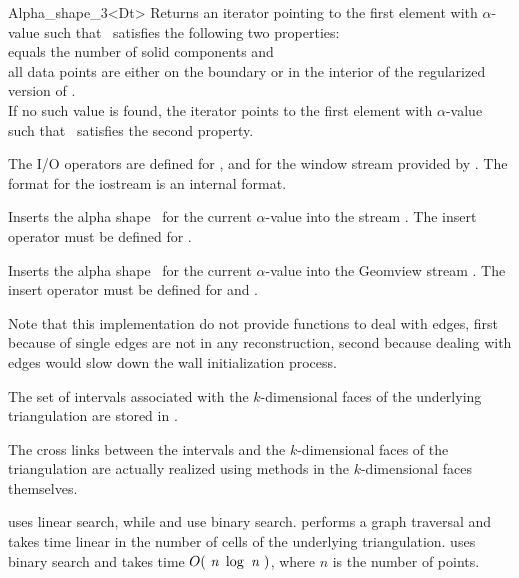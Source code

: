 \begin{ccRefClass} {Alpha_shape_3<Dt>}
{Returns an iterator pointing to the first element with $\alpha$-value
such that \ccVar\ satisfies the following two properties:\\
 equals the number of solid components and \\
all data points are either on the boundary or in the interior of the regularized version of \ccVar.\\
If no such value is found, the iterator points to the first element with 
$\alpha$-value such that \ccVar\ satisfies the second property.}


The I/O operators are defined for , and for
the window stream provided by \cgal. The format for the iostream
is an internal format. 


{Inserts the alpha shape \ccVar\ for the current $\alpha$-value into the stream .
\ccPrecond The insert operator must be defined for .}



{Inserts the alpha shape \ccVar\ for the current $\alpha$-value into the Geomview stream .
\ccPrecond The insert operator must be defined for  and .}

\ccImplementation

Note that this implementation do not provide functions to deal with edges, first
because of single edges are not in any reconstruction, second because dealing
with edges would slow down the wall initialization process.

The set of intervals associated with the
$k$-dimensional faces of the underlying triangulation are
stored in . 

The cross links between the intervals and the $k$-dimensional faces of the
triangulation are actually realized using methods in the $k$-dimensional faces
themselves.


 uses linear search, while 
 and  
use binary search.
 performs a graph traversal and takes time
linear in the number of cells of the underlying triangulation.
 uses binary search and takes time
$O(\mbox{ \em n } \log{\mbox{ \em n } })$, where  $n$ is the number of points.

\end{ccRefClass}

